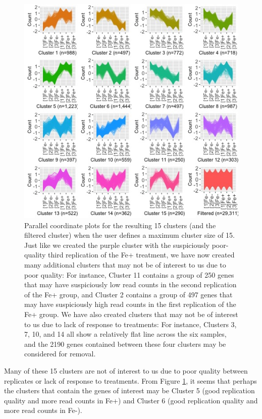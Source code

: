 \documentclass[11pt,a4paper,oldfontcommands,openany]{memoir}
\numberwithin{equation}{section} %
\begin{document}
\begin{figure}[H]
  \begin{framed}
  \centering
  \includegraphics[width=\textwidth]{L120_15}
  \end{framed}
  \caption{Parallel coordinate plots for the resulting 15 clusters (and the filtered cluster) when the user defines a maximum cluster size of 15. Just like we created the purple cluster with the suspiciously poor-quality third replication of the Fe+ treatment, we have now created many additional clusters that may not be of interest to us due to poor quality: For instance, Cluster 11 contains a group of 250 genes that may have suspiciously low read counts in the second replication of the Fe+ group, and Cluster 2 contains a group of 497 genes that may have suspiciously high read counts in the first replication of the Fe+ group. We have also created clusters that may not be of interest to us due to lack of response to treatments: For instance, Clusters 3, 7, 10, and 14 all show a relatively flat line across the six samples, and the 2190 genes contained between these four clusters may be considered for removal.}
  \label{fig:L120_15}
\end{figure}

Many of these 15 clusters are not of interest to us due to poor quality between replicates or lack of response to treatments. From Figure \ref{fig:L120_15}, it seems that perhaps the clusters that contain the genes of interest may be Cluster 5 (good replication quality and more read counts in Fe+) and Cluster 6 (good replication quality and more read counts in Fe-).
\end{document}
